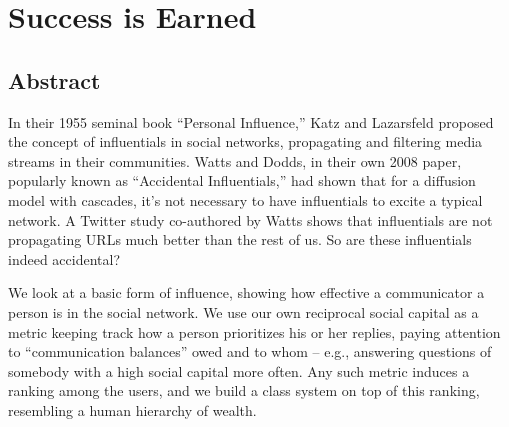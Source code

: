 \documentclass[10pt,oneside]{memoir}
\title{\mytitle}
\author{\myauthor}
\def\mychapterstyle{default}
\def\mypagestyle{headings}
\def\revision{}
\begin{document}
\chapterstyle{\mychapterstyle}
\pagestyle{\mypagestyle}

%
%

\frontmatter



\maketitle
\clearpage

\vspace*{\fill}

\setlength{\parindent}{0pt}

\ifx\mycopyright\undefined
\else
	\textcopyright{} \mycopyright
\fi

\revision

\begin{center}
\end{center}

\setlength{\parindent}{1em}
\clearpage

%
%


\setlength{\parindent}{1em}

\mainmatter
\chapter{Success is Earned}
\label{successisearned}

\section{Abstract}
\label{abstract}

In their 1955 seminal book ``Personal Influence,'' Katz and Lazarsfeld proposed the concept of influentials in social networks, propagating and filtering media streams in their communities.  Watts and Dodds, in their own 2008 paper, popularly known as ``Accidental Influentials,'' had shown that for a diffusion model with cascades, it's not necessary to have influentials to excite a typical network.  A Twitter study co-authored by Watts shows that influentials are not propagating URLs much better than the rest of us.  So are these influentials indeed accidental?


We look at a basic form of influence, showing how effective a communicator a person is in the social network.  We use our own reciprocal social capital as a metric keeping track how a person prioritizes his or her replies, paying attention to ``communication balances'' owed and to whom -- e.g., answering questions of somebody with a high social capital more often.  Any such metric induces a ranking among the users, and we build a class system on top of this ranking, resembling a human hierarchy of wealth.
\end{document}
